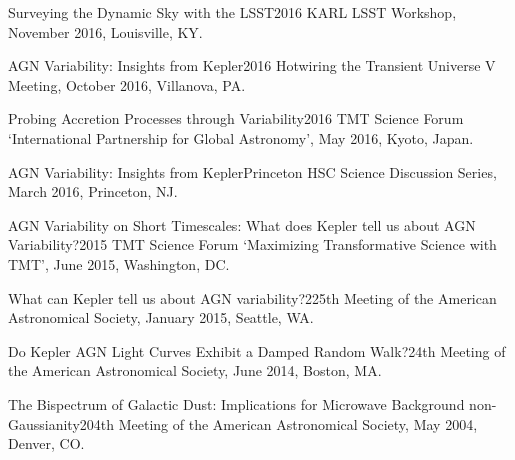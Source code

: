 \documentclass[10pt,a4paper]{article}
\begin{document}
\inlineheadsection
  {Surveying the Dynamic Sky with the LSST}{2016 KARL LSST Workshop, November 2016, Louisville, KY.}

\inlineheadsection
  {AGN Variability: Insights from Kepler}{2016 Hotwiring the Transient Universe V Meeting, October 2016, Villanova, PA.}

\inlineheadsection
  {Probing Accretion Processes through Variability}{2016 TMT Science Forum `International Partnership for Global Astronomy', May 2016, Kyoto, Japan.}

\inlineheadsection
  {AGN Variability: Insights from Kepler}{Princeton HSC Science Discussion Series, March 2016, Princeton, NJ.}

\inlineheadsection
  {AGN Variability on Short Timescales: What does Kepler tell us about AGN Variability?}{2015 TMT Science Forum `Maximizing Transformative Science with TMT', June 2015, Washington, DC.}

\inlineheadsection
  {What can Kepler tell us about AGN variability?}{225th Meeting of the American Astronomical Society, January 2015, Seattle, WA.}

\inlineheadsection
  {Do Kepler AGN Light Curves Exhibit a Damped Random Walk?}{24th Meeting of the American Astronomical Society, June 2014, Boston, MA.}

\inlineheadsection
  {The Bispectrum of Galactic Dust: Implications for Microwave Background non-Gaussianity}{204th Meeting of the American Astronomical Society, May 2004, Denver, CO.}
\end{document}
